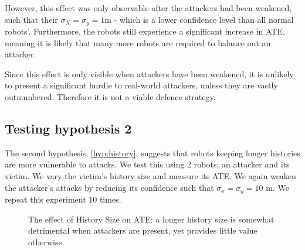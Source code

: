 However, this effect was only observable after the attackers had been weakened, such that their $\sigma_X = \sigma_y = 1$m - which is a lower confidence level than all normal robots'. Furthermore, the robots still experience a significant increase in ATE, meaning it is likely that many more robots are required to balance out an attacker.

Since this effect is only visible when attackers have been weakened, it is unlikely to present a significant hurdle to real-world attackers, unless they are vastly outnumbered. Therefore it is not a viable defence strategy.

\subsection{Testing hypothesis 2}
The second hypothesis, \ref{hyp:history}, suggests that robots keeping longer histories are more vulnerable to attacks. We test this using 2 robots; an attacker and its victim. We vary the victim's history size and measure its ATE. We again weaken the attacker's attacks by reducing its confidence such that $\sigma_x = \sigma_y = 10$ m. We repeat this experiment 10 times.

\begin{figure}[!h]
	\centering
	\caption{The effect of History Size on ATE: a longer history size is somewhat detrimental when attackers are present, yet provides little value otherwise.}
\end{figure}

